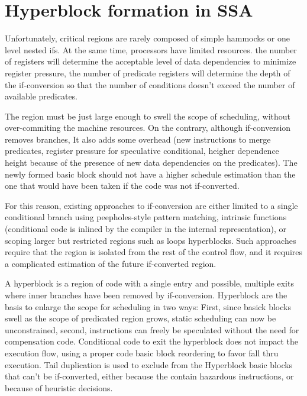 \section{Hyperblock formation in SSA}

Unfortunately, critical regions are rarely composed of simple hammocks or one level nested ifs. At the same time, processors have limited resources. the number of registers will determine the acceptable level of data dependencies to minimize register pressure, the number of predicate registers will determine the depth of the if-conversion so that the number of conditions doesn't exceed the number of available predicates. 

The region must be just large enough to swell the scope of scheduling, without over-commiting the machine resources. On the contrary, although if-conversion removes branches, It also adds some overhead (new instructions to merge predicates, register pressure for speculative conditional, heigher dependence height because of the presence of new data dependencies on the predicates). The newly formed basic block should not have a higher schedule estimation than the one that would have been taken if the code was not if-converted.

For this reason, existing approaches to if-conversion are either limited to a single conditional branch using peepholes-style pattern matching, intrinsic functions (conditional code is inlined by the compiler in the internal representation), or scoping larger but restricted regions such as loops hyperblocks. Such approaches require that the region is isolated from the rest of the control flow, and it requires a complicated estimation of the future if-converted region.

A hyperblock \cite{Mahlke:1992:ECS:144965.144998} is a region of code with a single entry and possible, multiple exits where inner branches have been removed by if-conversion.
Hyperblock are the basis to enlarge the scope for scheduling in two ways: First, since basick blocks swell as the scope of predicated region grows, static scheduling can now be unconstrained, second, instructions can freely be speculated without the need for compensation code. Conditional code to exit the hyperblock does not impact the execution flow, using a proper code basic block reordering to favor fall thru execution.
Tail duplication is used to exclude from the Hyperblock basic blocks that can't be if-converted, either because the contain hazardous instructions, or because of heuristic decisions.

